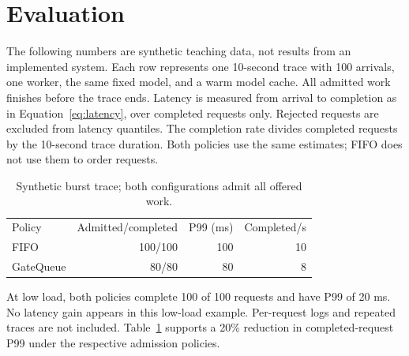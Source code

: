 \section{Evaluation}\label{sec:eval}
The following numbers are synthetic teaching data, not results from an
implemented system. Each row represents one 10-second trace with 100 arrivals,
one worker, the same fixed model, and a warm model cache. All admitted work
finishes before the trace ends. Latency is measured from arrival to completion
as in Equation~\ref{eq:latency}, over completed requests only. Rejected requests
are excluded from latency quantiles. The completion rate divides completed
requests by the 10-second trace duration. Both policies use the same estimates;
FIFO does not use them to order requests.

\begin{table}[h]
\centering
\begin{tabular}{lrrr}
Policy & Admitted/completed & P99 (ms) & Completed/s\\
FIFO & 100/100 & 100 & 10\\
GateQueue & 80/80 & 80 & 8\\
\end{tabular}
\caption{Synthetic burst trace; both configurations admit all offered work.}
\label{tab:burst}
\end{table}

At low load, both policies complete 100 of 100 requests and have P99 of 20 ms.
No latency gain appears in this low-load example. Per-request logs and repeated
traces are not included. Table~\ref{tab:burst} supports a 20\% reduction in
completed-request P99 under the respective admission policies.
